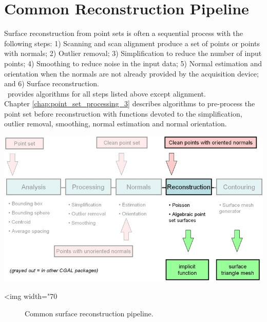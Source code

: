 \section{Common Reconstruction Pipeline}

Surface reconstruction from point sets is often a sequential process with the following steps: 1) Scanning and scan alignment produce a set of points or points with normals; 2) Outlier removal; 3) Simplification to reduce the number of input points; 4) Smoothing to reduce noise in the input data; 5) Normal estimation and orientation when the normals are not already provided by the acquisition device; and 6) Surface reconstruction. \\
\cgal\ provides algorithms for all steps listed above except alignment. \\
Chapter  \ref{chap:point_set_processing_3} describes algorithms to pre-process the point set before reconstruction with functions devoted to the simplification, outlier removal, smoothing, normal estimation and normal orientation.

\begin{center}
    \label{Surface_reconstruction_points_3-fig-pipeline}
    \begin{ccTexOnly}
        \includegraphics[width=1.0\textwidth]{Surface_reconstruction_points_3/pipeline} %
    \end{ccTexOnly}
    \begin{ccHtmlOnly}
        <img width="70%
    \end{ccHtmlOnly}
    \begin{figure}[h]
        \caption{Common surface reconstruction pipeline.}
    \end{figure}
\end{center}

